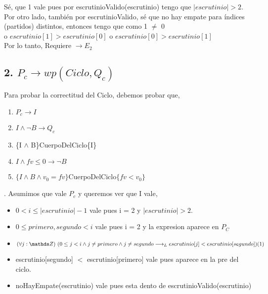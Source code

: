 \documentclass[10pt,a4paper]{article}
\begin{document}
\noindent Sé, que 1 vale pues por escrutinioValido(escrutinio) tengo que $|escrutinio| > 2$. Por otro lado, también por escrutinioValido, sé que no hay empate para índices (partidos) distintos, entonces tengo que como 1 $\neq$ 0 \\ o $escrutinio[1] > escrutinio[0]$ o $escrutinio[0] > escrutinio[1]$ \\

\noindent Por lo tanto, Requiere $\rightarrow E_2$ \\

\newpage

\subsection{2. $P_c \rightarrow wp(Ciclo, Q_c)$ }

\vspace{0.1cm}

\noindent Para probar la correctitud del Ciclo, debemos probar que, 

\begin{enumerate}\setlength{\itemindent}{0.5cm}
	\item $P_c \rightarrow I$
	\item $I \land \neg B \rightarrow Q_c$
	\item \{I $\land$ B\}CuerpoDelCiclo\{I\}
	\item $I \land fv \leq 0 \rightarrow \neg B$
	\item $\{I \land B \land v_0 = fv\}$CuerpoDelCiclo$\{fv < v_0\}$ \\
\end{enumerate}

. Asumimos que vale $P_c$ y queremos ver que I vale,

\begin{itemize}\setlength{\itemindent}{0.5cm}
	\item  $0 < i \leq |escrutinio| - 1$ vale pues i = 2 y $|escrutinio| > 2.$
	\item $0 \leq primero, segundo < i  $ vale pues i = 2 y la expresion aparece en $P_C$
	\item  $\paraTodo[unalinea]{j}{\ent}{0 \leq j < i \land j \neq primero \land  j \neq segundo \implicaLuego  escrutinio[j] < escrutinio[segundo]}  (1)$
	\item escrutinio[segundo] $<$ escrutinio[primero] vale pues aparece en la pre del ciclo.
	\item noHayEmpate(escrutinio) vale pues esta dento de escrutinioValido(escrutinio)
\end{itemize}
\end{document}
